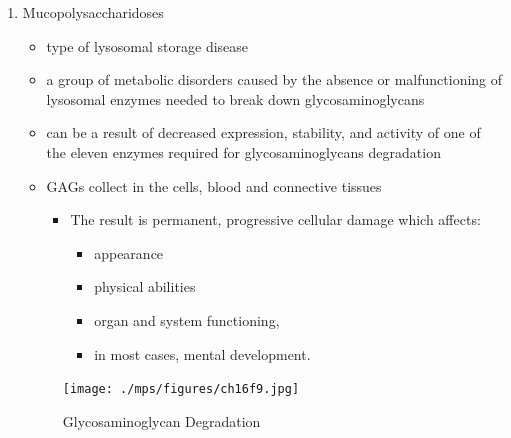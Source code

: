 \documentclass{scrartcl}
\begin{document}
\begin{enumerate}
\item Mucopolysaccharidoses
\label{sec:org8dfb18e}
\begin{itemize}
\item type of lysosomal storage disease
\item a group of metabolic disorders caused by the absence or
malfunctioning of lysosomal enzymes needed to break down
glycosaminoglycans
\item can be a result of decreased expression, stability, and activity of
one of the eleven enzymes required for glycosaminoglycans
degradation
\item GAGs collect in the cells, blood and connective tissues
\begin{itemize}
\item The result is permanent, progressive cellular damage which affects:
\begin{itemize}
\item appearance
\item physical abilities
\item organ and system functioning,
\item in most cases, mental development.
\end{itemize}
\end{itemize}
\end{itemize}

\begin{figure}[htbp]
\centering
\texttt{[image: ./mps/figures/ch16f9.jpg]}
\caption[Glycosaminoglycan Degradation]{\label{fig:org6997f18}
Glycosaminoglycan Degradation}
\end{figure}


\end{enumerate}
\end{document}
